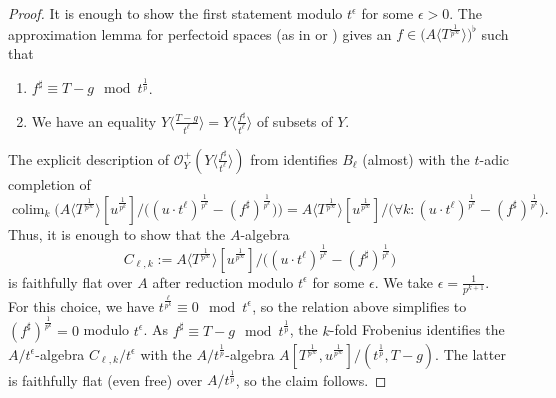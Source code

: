 \documentclass[10pt,reqno]{amsart}
\newcommand{\colim}{\mathop{\mathrm{colim}}}
\begin{document}
\begin{proof}
It is enough to show the first statement modulo $t^\epsilon$ for some $\epsilon > 0$. The approximation lemma for perfectoid spaces (as in \cite[Corollary 3.6.7]{KedlayaLiu} or \cite[Corollary 6.7]{ScholzePerfectoidSpaces}) gives an $f \in \big(A\langle T^{\frac{1}{p^\infty}} \rangle\big)^\flat$ such that 
\begin{enumerate}
\item $f^\sharp \equiv T - g \mod t^{\frac{1}{p}}$.
\item We have an equality $Y \langle \frac{T-g}{t^\ell} \rangle = Y \langle \frac{f^\sharp}{t^\ell} \rangle$ of subsets of $Y$.
\end{enumerate}
The explicit description of $\mathcal{O}_Y^+(Y \langle \frac{f^\sharp}{t^\ell} \rangle)$ from \cite[Lemma 6.4]{ScholzePerfectoidSpaces} identifies $B_\ell$ (almost)  with the $t$-adic completion of
\begin{equation}
\label{eq:PresentationBoundedFunctions}
\colim_k \Big(A\langle T^{\frac{1}{p^\infty}}\rangle[u^{\frac{1}{p^k}}] / \big((u \cdot t^\ell)^{\frac{1}{p^k}} - (f^\sharp)^{\frac{1}{p^k}}\big)\Big)    = A\langle T^{\frac{1}{p^\infty}}\rangle[u^{\frac{1}{p^\infty}}] / \big(\forall k:  (u \cdot t^\ell)^{\frac{1}{p^k}} - (f^\sharp)^{\frac{1}{p^k}}\big). 
\end{equation}
Thus, it is enough to show that the $A$-algebra
\[ C_{\ell,k} := A\langle T^{\frac{1}{p^\infty}}\rangle[u^{\frac{1}{p^\infty}}] / \big((u \cdot t^\ell)^{\frac{1}{p^k}} - (f^\sharp)^{\frac{1}{p^k}}\big)\]
is faithfully flat over $A$ after reduction modulo $t^\epsilon$ for some $\epsilon$. We take $\epsilon = \frac{1}{p^{k+1}}$. For this choice, we have $t^{\frac{\ell}{p^k}} \equiv 0 \mod t^\epsilon$, so the relation above simplifies to $(f^\sharp)^{\frac{1}{p^k}} = 0$ modulo $t^\epsilon$. As $f^\sharp \equiv T-g \mod t^{\frac{1}{p}}$, the $k$-fold Frobenius identifies the $A/t^\epsilon$-algebra $C_{\ell,k}/t^\epsilon$ with the $A/t^{\frac{1}{p}}$-algebra $A[T^{\frac{1}{p^\infty}},u^{\frac{1}{p^\infty}}]/(t^{\frac{1}{p}}, T-g)$. The latter is faithfully flat (even free) over $A/t^{\frac{1}{p}}$, so the claim follows.
%

\end{proof}
\end{document}
